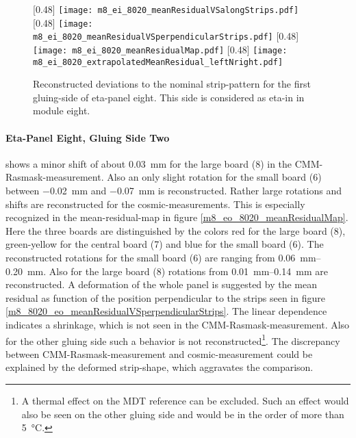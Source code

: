 \documentclass[
twoside,            %
BCOR1.4cm,          %
10pt,               %
headings=normal,    %
headsepline,        %
clearplainpage,		%
final,              %
div=14,
open=right,
bibliography=toc
]{scrreprt}
\begin{document}
\begin{figure}[!h]
	\centering
	[0.48\textwidth]
	{\texttt{[image: m8\_ei\_8020\_meanResidualVSalongStrips.pdf]}}
	\hfill
	[0.48\textwidth]
	{\texttt{[image: m8\_ei\_8020\_meanResidualVSperpendicularStrips.pdf]}}
	\hfill
	[0.48\textwidth]
	{\texttt{[image: m8\_ei\_8020\_meanResidualMap.pdf]}}
	\hfill
	[0.48\textwidth]
	{\texttt{[image: m8\_ei\_8020\_extrapolatedMeanResidual\_leftNright.pdf]}}
	\vspace{-2mm}
	\caption{
		Reconstructed deviations to the nominal strip-pattern for the first gluing-side of eta-panel eight.
		This side is considered as eta-in in module eight.
	}
	\label{eta8gs1} 
\end{figure}

\newpage

\paragraph{Eta-Panel Eight, Gluing Side Two}

shows a minor shift of about \SI{0.03}{mm} for the large board (8) in the CMM-Rasmask-measurement.
Also an only slight rotation for the small board (6) between \SI{-0.02}{mm} and \SI{-0.07}{mm} is reconstructed.
Rather large rotations and shifts are reconstructed for the cosmic-measurements.
This is especially recognized in the mean-residual-map in figure \ref{m8_eo_8020_meanResidualMap}.
Here the three boards are distinguished by the colors red for the large board (8), green-yellow for the central board (7) and blue for the small board (6).
The reconstructed rotations for the small board (6) are ranging from \SIrange{0.06}{0.20}{mm}.
Also for the large board (8) rotations from \SIrange{0.01}{0.14}{mm} are reconstructed.
A deformation of the whole panel is suggested by the mean residual as function of the position perpendicular to the strips seen in figure \ref{m8_8020_eo_meanResidualVSperpendicularStrips}.
The linear dependence indicates a shrinkage, which is not seen in the CMM-Rasmask-measurement.
Also for the other gluing side such a behavior is not reconstructed\footnote{
	A thermal effect on the MDT reference can be excluded.
	Such an effect would also be seen on the other gluing side and would be in the order of more than \SI{5}{\celsius}.
}.
The discrepancy between CMM-Rasmask-measurement and cosmic-measurement could be explained by the deformed strip-shape, which aggravates the comparison.
\end{document}
